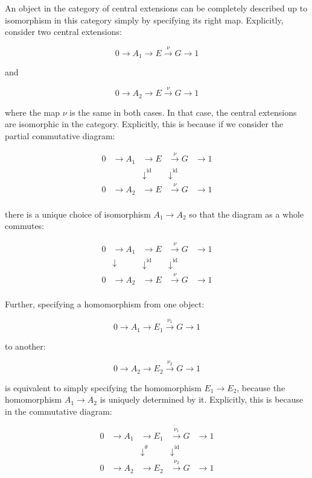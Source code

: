 An object in the category of central extensions can be completely
described up to isomorphism in this category simply by specifying its
right map. Explicitly, consider two central extensions:

$$0 \to A_1 \to E \stackrel{\nu}{\to} G \to 1$$

and

$$0 \to A_2 \to E \stackrel{\nu}{\to} G \to 1$$

where the map $\nu$ is the same in both cases. In that case, the
central extensions are isomorphic in the category. Explicitly, this is
because if we consider the partial commutative diagram:

$$\begin{array}{rrrrr}
  0 & \to A_1 & \to E & \stackrel{\nu}{\to} G & \to 1 \\
  &  & \downarrow^{\text{id}} & \downarrow^{\text{id}} &\\
  0 & \to A_2 & \to E & \stackrel{\nu}{\to} G & \to 1 \\
\end{array}$$

there is a unique choice of isomorphism $A_1 \to A_2$ so that the
diagram as a whole commutes:

$$\begin{array}{rrrrr}
  0 & \to A_1 & \to E & \stackrel{\nu}{\to} G & \to 1 \\
  & \downarrow & \downarrow^{\text{id}} & \downarrow^{\text{id}} &\\
  0 & \to A_2 & \to E & \stackrel{\nu}{\to} G & \to 1 \\
\end{array}$$

Further, specifying a homomorphism from one object:

$$0 \to A_1 \to E_1 \stackrel{\nu_1}{\to} G \to 1$$

to another:

$$0 \to A_2 \to E_2 \stackrel{\nu_2}{\to} G \to 1$$

is equivalent to simply specifying the homomorphism $E_1 \to E_2$,
because the homomorphism $A_1 \to A_2$ is uniquely determined by
it. Explicitly, this is because in the commutative diagram:

$$\begin{array}{rrrrr}
  0 & \to A_1 & \to E_1 & \stackrel{\nu_1}{\to} G & \to 1 \\
  &  & \downarrow^{\theta} & \downarrow^{\text{id}} &\\
  0 & \to A_2 & \to E_2 & \stackrel{\nu_2}{\to} G & \to 1 \\
\end{array}$$

